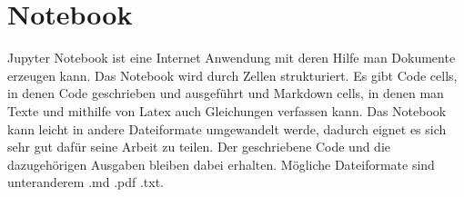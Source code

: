 
\chapter{Notebook} \label{chap:jupyter}

Jupyter Notebook ist eine Internet Anwendung mit deren Hilfe man Dokumente erzeugen kann. Das Notebook wird durch Zellen strukturiert. Es gibt Code cells, in denen Code geschrieben und ausgeführt und Markdown cells, in denen man Texte und mithilfe von Latex auch Gleichungen verfassen kann. Das Notebook kann leicht in andere Dateiformate umgewandelt werde, dadurch eignet es sich sehr gut dafür seine Arbeit zu teilen. Der geschriebene Code und die dazugehörigen Ausgaben bleiben dabei erhalten. Mögliche Dateiformate sind unteranderem .md .pdf .txt.
